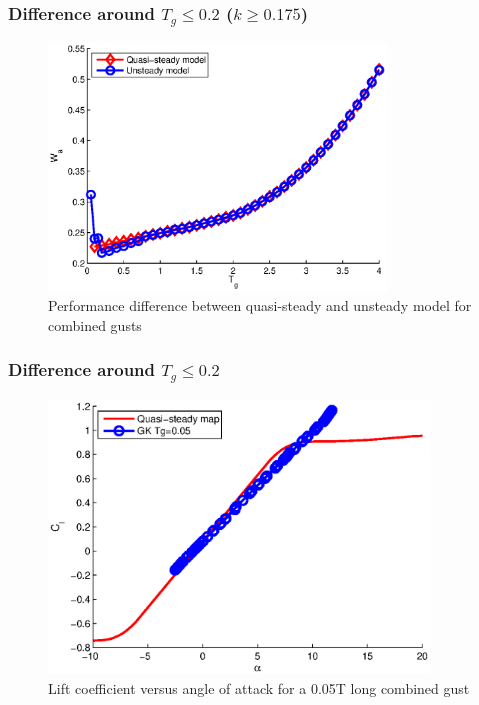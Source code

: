 \documentclass[compress]{beamer}
\begin{document}
\begin{frame}
  \frametitle{Difference around $T_g \le0.2$ ($k \ge 0.175$)}
  \begin{figure}[h]
    \centering
    \includegraphics[width=0.8\textwidth]{./Figures/LUT_vs_GK_Wg_vs_TG_windtype=3_alhpamax=12_nodalphalimit.eps}
    \caption{Performance difference between quasi-steady and unsteady model for combined gusts}
  \end{figure}
\end{frame}

\begin{frame}
  \frametitle{Difference around $T_g \le0.2$}

  \begin{figure}[h]
    \centering
    \includegraphics[width=0.9\textwidth]{./Figures/Cl_vs_alpha_Windtype=3_Tg=0p05_GK_alphamax=12.eps}
    \caption{Lift coefficient versus angle of attack for a 0.05T long combined gust}
  \end{figure}
\end{frame}
\end{document}
